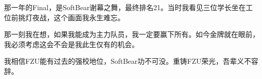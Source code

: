 \noindent 那一年的Final，是SoftBear谢幕之舞，最终排名21。当时我看见三位学长坐在工位前挑灯夜战，这个画面我永生难忘。

\noindent 那一刻我在想，如果我能成为主力队员，我一定要赢下所有。如今金牌就在眼前，我必须考虑这会不会是我此生仅有的机会。

\noindent 我相信FZU能有过去的强校地位，SoftBear功不可没。重铸FZU荣光，吾辈义不容辞。

